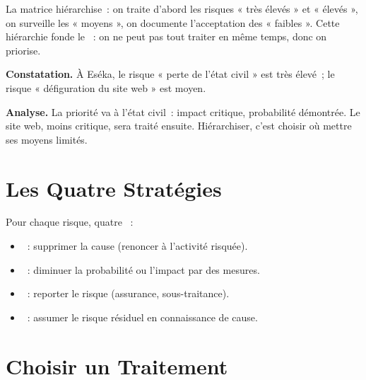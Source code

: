 La matrice hiérarchise~: on traite d'abord les risques « très élevés » et
« élevés », on surveille les « moyens », on documente l'acceptation des
« faibles ». Cette hiérarchie fonde le ~: on ne
peut pas tout traiter en même temps, donc on priorise.

\begin{boxprocedure}
\textbf{Constatation.} À Eséka, le risque « perte de l'état civil » est très
élevé~; le risque « défiguration du site web » est moyen.

\medskip
\textbf{Analyse.} La priorité va à l'état civil~: impact critique, probabilité
démontrée. Le site web, moins critique, sera traité ensuite. Hiérarchiser,
c'est choisir où mettre ses moyens limités.
\end{boxprocedure}

\section{Les Quatre Stratégies}
\label{sec:c13-strategies}

\begin{boxdef}
Pour chaque risque, quatre ~:
\begin{itemize}
    \item {}~: supprimer la cause (renoncer à l'activité
          risquée).
    \item {}~: diminuer la probabilité ou l'impact par des
          mesures.
    \item {}~: reporter le risque (assurance,
          sous-traitance).
    \item {}~: assumer le risque résiduel en connaissance de
          cause.
\end{itemize}
\end{boxdef}

\section{Choisir un Traitement}
\label{sec:c13-choisir}

